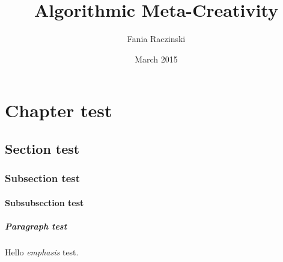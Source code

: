 \documentclass[11pt]{thesis} %
\title{Algorithmic Meta-Creativity}
\author{Fania Raczinski}
\date{March 2015}
\begin{document}
\tableofcontents\label{toc}

\chapter{Chapter test}
\vspace{5cm}
\section{Section test}
\lipsum[1]

\subsection{Subsection test}
\lipsum[1]
\subsubsection{Subsubsection test}
\lipsum[1]
\paragraph{Paragraph test}
Hello \emph{emphasis} test.
\end{document}
